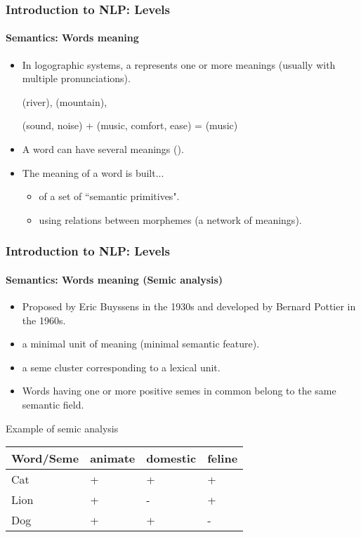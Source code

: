 \documentclass[xcolor=table]{beamer}
\begin{document}
\begin{frame}
\frametitle{Introduction to NLP: Levels}
\framesubtitle{Semantics: Words meaning}

\begin{itemize}
	\item In logographic systems, a  represents one or more meanings (usually with multiple pronunciations).
	
	\begin{CJK}{UTF8}{min}
		 (river),  (mountain), 
		
		 (sound, noise) +  (music, comfort, ease) =  (music)
	\end{CJK}

	\item A word can have several meanings ().
	\item The meaning of a word is built...
	\begin{itemize}
		\item of a set of ``semantic primitives".
		\item using relations between morphemes (a network of meanings).
	\end{itemize}
\end{itemize}

\end{frame}


\begin{frame}
\frametitle{Introduction to NLP: Levels}
\framesubtitle{Semantics: Words meaning (Semic analysis)}

\begin{itemize}
	\item Proposed by Eric Buyssens in the 1930s and developed by Bernard Pottier in the 1960s.
	\item {} a minimal unit of meaning (minimal semantic feature).
	\item {} a seme cluster corresponding to a lexical unit.
	\item Words having one or more positive semes in common belong to the same semantic field.
\end{itemize}

\begin{exampleblock}{Example of semic analysis}
	\centering
	\begin{tabular}{|l|l|l|l|}
		\hline
		Word/Seme & animate & domestic & feline \\
		\hline
		Cat & + & + & + \\
		\hline
		Lion & + & - & + \\
		\hline
		Dog & + & + & - \\
		\hline
	\end{tabular}
\end{exampleblock}

\end{frame}
\end{document}
